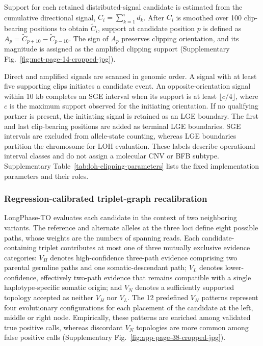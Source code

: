 \documentclass[pdflatex,sn-nature]{sn-jnl}
\begin{document}
Support for each retained distributed-signal candidate is estimated from the cumulative directional signal, \(C_i=\sum_{k=1}^{i}d_k\). After \(C_i\) is smoothed over 100 clip-bearing positions to obtain \(\widetilde{C}_i\), support at candidate position \(p\) is defined as \(A_p=\widetilde{C}_{p+10}-\widetilde{C}_{p-10}\). The sign of \(A_p\) preserves clipping orientation, and its magnitude is assigned as the amplified clipping support (Supplementary Fig.~\ref{fig:met-page-14-cropped-jpg}).

Direct and amplified signals are scanned in genomic order. A signal with at least five supporting clips initiates a candidate event. An opposite-orientation signal within 10 kb completes an SGE interval when its support is at least \(\lfloor c/4\rfloor\), where \(c\) is the maximum support observed for the initiating orientation. If no qualifying partner is present, the initiating signal is retained as an LGE boundary. The first and last clip-bearing positions are added as terminal LGE boundaries. SGE intervals are excluded from allele-state counting, whereas LGE boundaries partition the chromosome for LOH evaluation. These labels describe operational interval classes and do not assign a molecular CNV or BFB subtype. Supplementary Table~\ref{tab:loh-clipping-parameters} lists the fixed implementation parameters and their roles.


\subsubsection{Regression-calibrated triplet-graph recalibration}\label{pattern-based-filtering-for-somatic-variant-calling}

LongPhase-TO evaluates each candidate in the context of two neighboring variants. The reference and alternate alleles at the three loci define eight possible paths, whose weights are the numbers of spanning reads. Each candidate-containing triplet contributes at most one of three mutually exclusive evidence categories: \(V_H\) denotes high-confidence three-path evidence comprising two parental germline paths and one somatic-descendant path; \(V_L\) denotes lower-confidence, effectively two-path evidence that remains compatible with a single haplotype-specific somatic origin; and \(V_N\) denotes a sufficiently supported topology accepted as neither \(V_H\) nor \(V_L\). The 12 predefined \(V_H\) patterns represent four evolutionary configurations for each placement of the candidate at the left, middle or right node. Empirically, these patterns are enriched among validated true positive calls, whereas discordant \(V_N\) topologies are more common among false positive calls (Supplementary Fig.~\ref{fig:app-page-38-cropped-jpg}).
\end{document}
